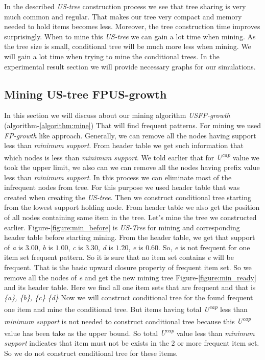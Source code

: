     
    In the described \emph{US-tree} construction process we see that tree sharing is very much common and regular. That makes our tree very compact and memory needed to hold items becomes less. Moreover, the tree construction time improves surprisingly. When to mine this \emph{US-tree} we can gain a lot time when mining. As the tree size is small, conditional tree will be much more less when mining. We will gain a lot time when trying to mine the conditional trees. In the experimental result section we will provide necessary graphs for our simulations.
    \subsection{Mining US-tree FPUS-growth}
    In this section we will discuss about our mining algorithm \emph{USFP-growth} (algorithm-\ref{algorithm:mine}) That will find frequent patterns. For mining we used \emph{FP-growth} like approach. Generally, we can remove all the nodes having support less than \emph{minimum support}. From header table we get such information that which nodes is less than \emph{minimum support}. We told earlier that for \emph{U\textsuperscript{cap}} value we took the upper limit, we also can we can remove all the nodes having prefix value less than \emph{minimum support}. In this process we can eliminate most of the infrequent nodes from tree. For this purpose we used header table that was created when creating the \emph{US-tree}. Then we construct conditional tree starting from the lowest support holding node. From header table we also get the position of all nodes containing same item in the tree. 
    Let’s mine the tree we constructed earlier. Figure-\ref{figure:min_before} is \emph{US-Tree} for mining and corresponding header table before starting mining. From the header table, we get that support of \emph{a} is $3.00$, \emph{b} is $1.00$, \emph{c} is $3.30$, \emph{d} is $1.20$, \emph{e} is $0.60$. So, \emph{e} is not frequent for one item set frequent pattern. So it is sure that no item set contains \emph{e} will be frequent. That is the basic upward closure property of frequent item set. So we remove all the nodes of \emph{e} and get the new mining tree Figure-\ref{figure:min_ready} and its header table. Here we find all one item sets that are frequent and that is \emph{\{a\}, \{b\}, \{c\} \{d\}} Now we will construct conditional tree for the found frequent one item and mine the conditional tree. But items having total \emph{U\textsuperscript{cap}} less than \emph{minimum support} is not needed to construct conditional tree because this \emph{U\textsuperscript{cap}} value has been take as the upper bound. So total \emph{U\textsuperscript{cap}} value less than \emph{minimum support} indicates that item must not be exists in the $2$ or more frequent item set. So we do not construct conditional tree for these items.
